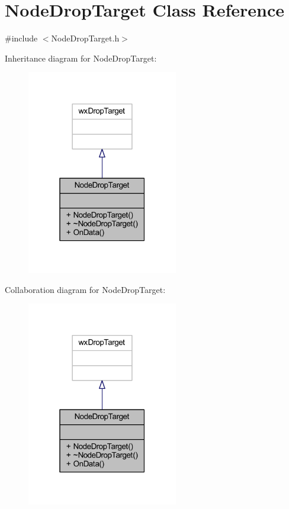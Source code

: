 \hypertarget{class_node_drop_target}{}\section{Node\+Drop\+Target Class Reference}
\label{class_node_drop_target}


{\ttfamily \#include $<$Node\+Drop\+Target.\+h$>$}



Inheritance diagram for Node\+Drop\+Target\+:\nopagebreak
\begin{figure}[H]
\begin{center}
\leavevmode
\includegraphics[width=187pt]{class_node_drop_target__inherit__graph}
\end{center}
\end{figure}


Collaboration diagram for Node\+Drop\+Target\+:\nopagebreak
\begin{figure}[H]
\begin{center}
\leavevmode
\includegraphics[width=187pt]{class_node_drop_target__coll__graph}
\end{center}
\end{figure}
